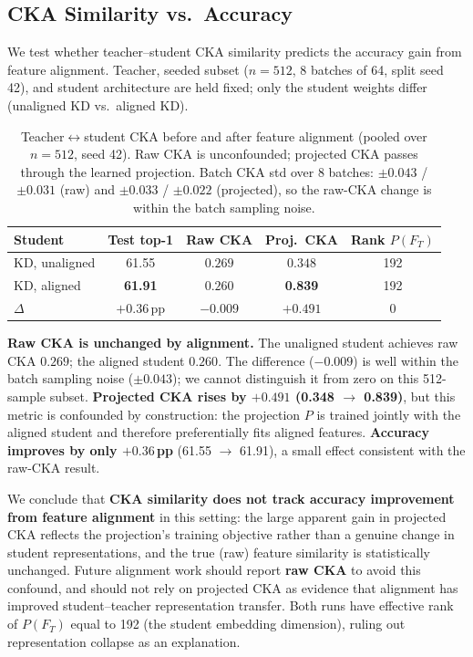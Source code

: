 \documentclass[11pt, letterpaper]{article}
\begin{document}
\subsection{CKA Similarity vs.\ Accuracy}
\label{sec:cka-decoupling}

We test whether teacher--student CKA similarity predicts the accuracy gain
from feature alignment. Teacher, seeded subset ($n=512$, 8 batches of 64, split seed 42), and student architecture are held fixed; only the student
weights differ (unaligned KD vs.\ aligned KD).

\begin{table}[htbp]
\centering
\begin{tabular}{lcccc}
\toprule
\textbf{Student} & \textbf{Test top-1} & \textbf{Raw CKA} & \textbf{Proj.\ CKA} & \textbf{Rank $P(F_T)$} \\
\midrule
KD, unaligned & 61.55 & $0.269$ & $0.348$ & 192 \\
KD, aligned & \textbf{61.91} & $0.260$ & \textbf{0.839} & 192 \\
\midrule
$\Delta$ & $+0.36$\,pp & $-0.009$ & $+0.491$ & 0 \\
\bottomrule
\end{tabular}
\caption{Teacher$\leftrightarrow$student CKA before and after feature
alignment (pooled over $n=512$, seed 42). Raw CKA is unconfounded; projected
CKA passes through the learned projection. Batch CKA std over 8 batches:
$\pm 0.043$ / $\pm 0.031$ (raw) and $\pm 0.033$ / $\pm 0.022$ (projected),
so the raw-CKA change is within the batch sampling noise.}
\label{tab:cka}
\end{table}

\textbf{Raw CKA is unchanged by alignment.} The unaligned student achieves
raw CKA $0.269$; the aligned student $0.260$. The difference ($-0.009$) is well within the batch sampling noise
($\pm 0.043$); we cannot distinguish it from zero on this 512-sample subset. \textbf{Projected CKA rises by $+0.491$ (0.348 $\to$ 0.839)},
but this metric is confounded by construction: the projection $P$ is
trained jointly with the aligned student and therefore preferentially fits
aligned features. \textbf{Accuracy improves by only $+0.36$\,pp}
(61.55 $\to$ 61.91), a small effect consistent with the raw-CKA result.

We conclude that \textbf{CKA similarity does not track accuracy improvement
from feature alignment} in this setting: the large apparent gain in
projected CKA reflects the projection's training objective rather than a
genuine change in student representations, and the true (raw) feature
similarity is statistically unchanged. Future alignment work should report
\textbf{raw CKA} to avoid this confound, and should not rely on projected
CKA as evidence that alignment has improved student--teacher representation
transfer. Both runs have effective rank of $P(F_T)$ equal to 192 (the
student embedding dimension), ruling out representation collapse as an
explanation.
\end{document}
